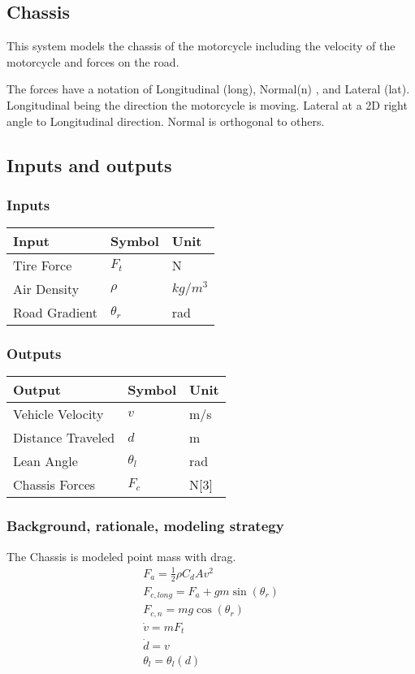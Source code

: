 \documentclass[../SimBALink.tex]{subfiles}
\begin{document}
\subsection{Chassis} This system models the chassis of the motorcycle including the velocity of the motorcycle and forces on the road.

The forces have a notation of Longitudinal (long), Normal(n) , and Lateral (lat). Longitudinal being the direction the motorcycle is moving. Lateral at a 2D right angle to Longitudinal direction. Normal is orthogonal to others. 

\subsection{Inputs and outputs}
	\subsubsection{Inputs}
	\begin{tabular}{ l | l | l  }
		Input					&	Symbol		&	Unit		\\	\hline
		Tire Force				& 	$F_t$ 		&	N \\		
		Air Density 			&	$\rho$		& $kg/m^3$ \\
		Road Gradient			&	$\theta_r$  & rad
	\end{tabular}
	
	\subsubsection{Outputs}
	\begin{tabular}{ l | l | l  }
		Output					&	Symbol		&	Unit		\\	\hline
		Vehicle Velocity		&	$v$			&	m/s \\
		Distance Traveled		&	$d$			&	m \\
		Lean Angle 				&	$\theta_l$	&   rad	\\
		Chassis Forces			&	$F_c$		&	N[3]
	\end{tabular}

\subsubsection{Background, rationale, modeling strategy}
The Chassis is modeled point mass with drag.
\begin{gather}
		F_a = \frac{1}{2} \rho C_dAv^2 \\
		F_{c,long}  = F_a + gm\sin(\theta_r)  \\
		F_{c,n} = mg\cos(\theta_r) \\
		\dot{v} = mF_t \\
		\dot{d} = v \\
		\theta_l = \theta_l(d)
\end{gather}
\end{document}
